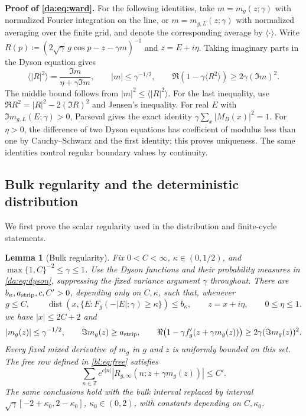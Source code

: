 \documentclass[11pt]{article}
\numberwithin{equation}{section}
\newtheorem{lemma}[theorem]{Lemma}
\theoremstyle{remark}
\newcommand{\Z}{\mathbb Z}
\newcommand{\dist}{\operatorname{dist}}
\begin{document}
\noindent\textbf{Proof of \eqref{da:eq:ward}.}
For the following identities, take $m=m_g(z;\gamma)$ with normalized
Fourier integration on the line, or $m=m_{g,L}(z;\gamma)$ with normalized
averaging over the finite grid, and denote the corresponding average by
$\langle\cdot\rangle$. Write
$R(p)\coloneqq (2\sqrt\gamma\,g\cos p-z-\gamma m)^{-1}$ and $z=E+i\eta$.
Taking imaginary parts in the Dyson equation gives
\begin{equation}\label{da:eq:ward}
 \langle|R|^2\rangle=\frac{\Im m}{\eta+\gamma\Im m},\qquad
 |m|\le\gamma^{-1/2},\qquad
 \Re(1-\gamma\langle R^2\rangle)
 \ge 2\gamma(\Im m)^2.
\end{equation}
The middle bound follows from $|m|^2\le\langle|R|^2\rangle$.
For the last inequality, use
$\Re R^2=|R|^2-2(\Im R)^2$ and Jensen's inequality.
For real $E$ with $\Im m_{g,L}(E;\gamma)>0$, Parseval gives the exact identity
$\gamma\sum_x|M_B(x)|^2=1$. For $\eta>0$, the difference of two
Dyson equations has coefficient of modulus less than one by
Cauchy--Schwarz and the first identity; this proves uniqueness.
The same identities control regular boundary values by continuity.

\subsection{Bulk regularity and the deterministic distribution}
\label{app:bulk-regularity}
We first prove the scalar regularity used in the distribution and
finite-cycle statements.

\begin{lemma}[Bulk regularity]\label{bl:lem:regular}
Fix $0<C<\infty$, $\kappa\in(0,1/2)$, and
$\max\{1,C\}^{-2}\le\gamma\le1$. Use the Dyson functions and their
probability measures in \eqref{da:eq:dyson}, suppressing the fixed
variance argument $\gamma$ throughout. There are
\(b_\kappa,a_{\rm strip},c,C'>0\), depending only on
\(C,\kappa\), such that, whenever
\begin{equation}\label{bl:eq:regular-domain}
 g\le C,\qquad
 \dist(x,\{E:F_g(-|E|;\gamma)\ge\kappa\})\le b_\kappa,\qquad
 z=x+i\eta,\qquad 0\le\eta\le1.
\end{equation}
we have \(|x|\le2C+2\) and
\begin{equation}\label{bl:eq:regular-bounds}
 |m_g(z)|\le\gamma^{-1/2},\qquad \Im m_g(z)\ge a_{\rm strip},\qquad
 \Re\bigl(1-\gamma f_g'(z+\gamma m_g(z))\bigr)
       \ge2\gamma(\Im m_g(z))^2.
\end{equation}
Every fixed mixed derivative of \(m_g\) in \(g\) and \(z\)
is uniformly bounded on this set. The free row defined in \eqref{bl:eq:free} satisfies
\[
 \sum_{n\in\Z}e^{c|n|}
       |R_{g,\infty}(n;z+\gamma m_g(z))|\le C'.
\]
The same conclusions hold with the bulk interval replaced by
interval \(\sqrt\gamma[-2+\kappa_0,2-\kappa_0]\),
\(\kappa_0\in(0,2)\), with constants depending on \(C,\kappa_0\).
\end{lemma}
\end{document}
